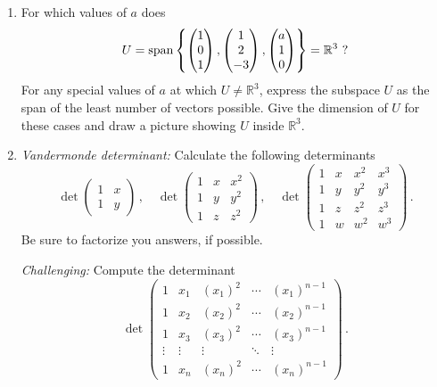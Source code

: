 \begin{enumerate}
\item
For which values of $a$ does \[U=\operatorname{span}\left\{
\begin{pmatrix}1\\0\\1\end{pmatrix},\begin{pmatrix}1\\2\\-3\end{pmatrix},\begin{pmatrix}a\\1\\0\end{pmatrix}\right\}={\mathbb R}^3\ ?\]
 For any special values of $a$ at which $U\neq{\mathbb R}^3$, express the subspace $U$ as the span of the least number of vectors possible. Give the dimension of $U$ for these cases and
 draw a picture showing $U$ inside ${\mathbb R}^3$.

\item
{\itshape Vandermonde determinant:} Calculate the following determinants
\[
\det \begin{pmatrix}1 & x\\ 1 & y\end{pmatrix}\, ,\quad
\det \begin{pmatrix}1 & x & x^2\\ 1 & y&y^2\\ 1& z&z^2\end{pmatrix}\, ,\quad
\det \begin{pmatrix}1 & x & x^2 & x^3\\ 1 & y& y^2 & y^3\\ 1 & z & z^2 & z^3\\ 1 & w & w^2 & w^3\end{pmatrix}\, .
\]
Be sure to factorize you answers, if possible.

{\itshape Challenging:} Compute the determinant
\[
\det \begin{pmatrix}1 & x_1 & (x_1)^2 & \cdots &(x_1)^{n-1}\\ 
1 & x_2& (x_2)^2 & \cdots &  (x_2)^{n-1}\\ 
1 & x_3& (x_3)^2 & \cdots &  (x_3)^{n-1}\\ 
\vdots &\vdots &\vdots &\ddots & \vdots\ \ \  \\ 
1 & x_n& (x_n)^2 & \cdots &  (x_n)^{n-1}\end{pmatrix}\, .
\]


\end{enumerate}
